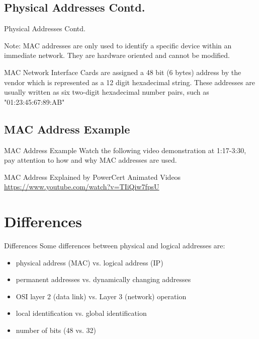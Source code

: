 \documentclass[10pt, aspectratio=43]{beamer}
\begin{document}
\subsection{Physical Addresses Contd.}
\begin{frame}{Physical Addresses Contd.}
\begin{block}{Note:}
    MAC addresses are only used to identify a specific device within an immediate network. They are hardware oriented and cannot be modified. 
\end{block}


\begin{alertblock}{MAC}
Network Interface Cards are assigned a 48 bit (6 bytes) address by the vendor which is represented as a 12 digit hexadecimal string.  These addresses are usually written as six two-digit hexadecimal number pairs, such as "01:23:45:67:89:AB"
\end{alertblock}

\end{frame}

\subsection{MAC Address Example}
\begin{frame}{MAC Address Example}
Watch the following video demonstration at 1:17-3:30, pay attention to how and why MAC addresses are used.

\vspace{0.25cm}

\begin{example}
MAC Address Explained by PowerCert Animated Videos
\url{https://www.youtube.com/watch?v=TIiQiw7fpsU}
\end{example}
    
\end{frame}



\section{Differences}
\begin{frame}{Differences}
    Some differences between physical and logical addresses are:
\begin{itemize}
    \item physical address (MAC) vs. logical address (IP)
    \item permanent addresses vs. dynamically changing addresses
    \item OSI layer 2 (data link) vs. Layer 3 (network) operation
    \item local identification vs. global identification
    \item number of bits (48 vs. 32)
\end{itemize}
\end{frame}
\end{document}
